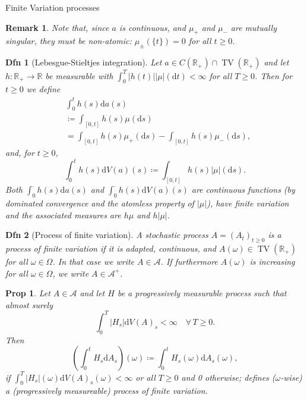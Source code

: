 \documentclass[a4paper]{article}
\theoremstyle{mytheoremstyle}
\newtheorem{definition}{Dfn}
\newtheorem{proposition}{Prop}
\newtheorem*{remark}{Remark}
\newcommand{\1}{\mathds{1}}
\begin{document}
\begin{multicols*}{3}
\begin{roundbox}{Finite Variation processes}
\begin{remark}
  Note that, since $a$ is continuous, and $\mu_+$ and $\mu_-$ are mutually
  singular, they must be non-atomic: $\mu_{\pm} (\{ t \}) = 0$ for all $t
  \geqslant 0$.
\end{remark}

\begin{definition}[Lebesgue-Stieltjes integration]
  Let $a \in C (\mathbb{R}_+) \cap \operatorname{TV} (\mathbb{R}_+)$ and let $h
  : \mathbb{R}_+ \rightarrow \mathbb{R}$ be measurable with $\int_0^T | h (t) |
  | \mu | (\mathrm{d} t) < \infty$ for all $T \geqslant 0$. Then for $t
  \geqslant 0$ we define
  \begin{align*}
    & \int_0^t h (s) \mathrm{d} a (s) \\
    &\coloneq \int_{[0, t]} h (s) \mu (\mathrm{d} s) \\
    &= \int_{[0, t]} h (s) \mu_+ (\mathrm{d} s) - \int_{[0, t]} h (s) \mu_- (\mathrm{d} s),
  \end{align*}
  and, for $t \geqslant 0$,
  \[
    \int_0^t h (s) \mathrm{d} V (a) (s) \coloneq \int_{[0, t]} h (s) | \mu |
     (\mathrm{d} s).
  \]
  Both $\int_0^{\cdot} h (s) \mathrm{d} a (s)$ and $\int_0^{\cdot} h (s)
  \mathrm{d} V (a) (s)$ are continuous functions (by dominated convergence and the
  atomless property of $| \mu |$), have finite variation and the associated
  measures are $h \mu$ and $h | \mu |$.
\end{definition}

\begin{definition}[Process of finite variation]
  A stochastic process $A = (A_t)_{t \geqslant 0}$ is a {\emph{process of
  finite variation}} if it is adapted, continuous, and $A (\omega) \in
  \operatorname{TV} (\mathbb{R}_+)$ for all $\omega \in \Omega$. In that case we write
  $A \in \mathcal{A}$. If furthermore $A (\omega)$ is increasing for all
  $\omega \in \Omega$, we write $A \in \mathcal{A}^+$.
\end{definition}

\begin{proposition}
  Let $A \in \mathcal{A}$ and let $H$ be a progressively measurable process
  such that almost surely
  \[
    \int_0^T |H_s | \mathrm{d} V (A)_s < \infty \quad \forall \, T \geqslant 0.
  \]
  Then
  \[
    \left( \int_0^t H_s \mathrm{d} A_s \right) (\omega) \coloneq
       \int_0^t H_s (\omega) \mathrm{d} A_s (\omega),
  \]
   if $\int_0^T |H_s | (\omega) \mathrm{d} V (A)_s (\omega) < \infty$ or all $T
  \geqslant 0$ and 0 otherwise; defines ($\omega$-wise) a (progressively
  measureable) process of finite variation.
\end{proposition}
\end{roundbox}


\end{multicols*}
\end{document}
